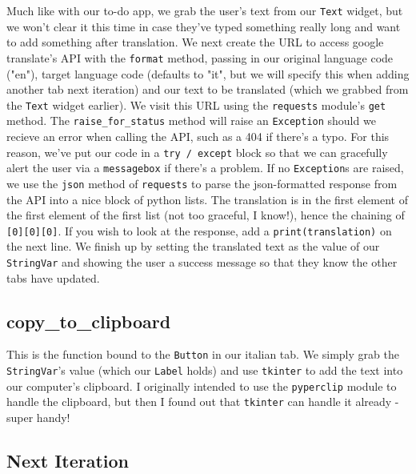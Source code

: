 \documentclass[a4paper,11pt,openany]{book}
\begin{document}
Much like with our to-do app, we grab the user's text from our \lstinline[columns=fixed]{Text} widget, but we won't clear it this time in case they've typed something really long and want to add something after translation. We next create the URL to access google translate's API with the \lstinline[columns=fixed]{format} method, passing in our original language code ("en"), target language code (defaults to "it", but we will specify this when adding another tab next iteration) and our text to be translated (which we grabbed from the \lstinline[columns=fixed]{Text} widget earlier). We visit this URL using the \lstinline[columns=fixed]{requests} module's \lstinline[columns=fixed]{get} method. The \lstinline[columns=fixed]{raise_for_status} method will raise an \lstinline[columns=fixed]{Exception} should we recieve an error when calling the API, such as a 404 if there's a typo. For this reason, we've put our code in a \lstinline[columns=fixed]{try / except} block so that we can gracefully alert the user via a \lstinline[columns=fixed]{messagebox} if there's a problem. If no \lstinline[columns=fixed]{Exception}s are raised, we use the \lstinline[columns=fixed]{json} method of \lstinline[columns=fixed]{requests} to parse the json-formatted response from the API into a nice block of python lists. The translation is in the first element of the first element of the first list (not too graceful, I know!), hence the chaining of \lstinline[columns=fixed]{[0][0][0]}. If you wish to look at the response, add a \lstinline[columns=fixed]{print(translation)} on the next line. We finish up by setting the translated text as the value of our \lstinline[columns=fixed]{StringVar} and showing the user a success message so that they know the other tabs have updated.

\subsection{copy\_to\_clipboard}  

This is the function bound to the \lstinline[columns=fixed]{Button} in our italian tab. We simply grab the \lstinline[columns=fixed]{StringVar}'s value (which our \lstinline[columns=fixed]{Label} holds) and use \lstinline[columns=fixed]{tkinter} to add the text into our computer's clipboard. I originally intended to use the \lstinline[columns=fixed]{pyperclip} module to handle the clipboard, but then I found out that \lstinline[columns=fixed]{tkinter} can handle it already - super handy!

\subsection{Next Iteration}
\end{document}
